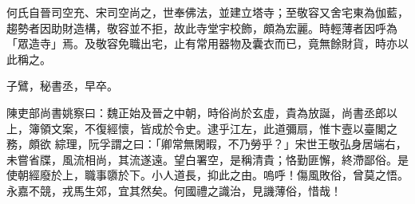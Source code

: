 \begin{pinyinscope}
 何氏自晉司空充、宋司空尚之，世奉佛法，並建立塔寺；至敬容又舍宅東為伽藍，趨勢者因助財造構，敬容並不拒，故此寺堂宇校飾，頗為宏麗。時輕薄者因呼為「眾造寺」焉。及敬容免職出宅，止有常用器物及囊衣而已，竟無餘財貨，時亦以此稱之。



 子鷿，秘書丞，早卒。



 陳吏部尚書姚察曰：魏正始及晉之中朝，時俗尚於玄虛，貴為放誕，尚書丞郎以上，簿領文案，不復經懷，皆成於令史。逮乎江左，此道彌扇，惟卞壼以臺閣之務，頗欲
 綜理，阮孚謂之曰：「卿常無閑暇，不乃勞乎？」宋世王敬弘身居端右，未嘗省牒，風流相尚，其流遂遠。望白署空，是稱清貴；恪勤匪懈，終滯鄙俗。是使朝經廢於上，職事隳於下。小人道長，抑此之由。嗚呼！傷風敗俗，曾莫之悟。永嘉不競，戎馬生郊，宜其然矣。何國禮之識治，見譏薄俗，惜哉！



\end{pinyinscope}